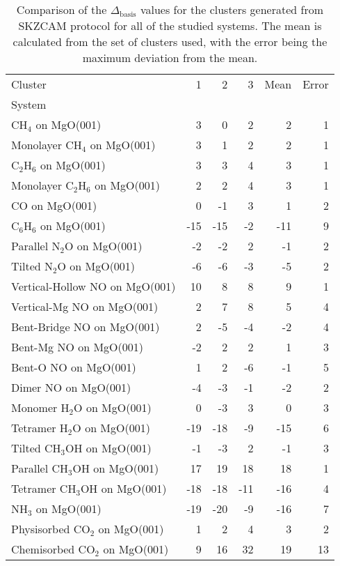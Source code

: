 \begin{table}
\caption{\label{tab:deltabasis}Comparison of the $\Delta_\textrm{basis}$ values for the clusters generated from SKZCAM protocol for all of the studied systems. The mean is calculated from the set of clusters used, with the error being the maximum deviation from the mean.}
\begin{adjustbox}{center,max width=1\textwidth}
\begin{tabular}{lrrrrr}
\toprule
Cluster & 1 & 2 & 3 & Mean & Error \\ 
System &  &  &  &  &  \\
\midrule
CH$_4$ on MgO(001) & 3 & 0 & 2 & 2 & 1 \\
Monolayer CH$_4$ on MgO(001) & 3 & 1 & 2 & 2 & 1 \\
C$_2$H$_6$ on MgO(001) & 3 & 3 & 4 & 3 & 1 \\
Monolayer C$_2$H$_6$ on MgO(001) & 2 & 2 & 4 & 3 & 1 \\
CO on MgO(001) & 0 & -1 & 3 & 1 & 2 \\
C$_6$H$_6$ on MgO(001) & -15 & -15 & -2 & -11 & 9 \\
Parallel N$_2$O on MgO(001) & -2 & -2 & 2 & -1 & 2 \\
Tilted N$_2$O on MgO(001) & -6 & -6 & -3 & -5 & 2 \\
Vertical-Hollow NO on MgO(001) & 10 & 8 & 8 & 9 & 1 \\
Vertical-Mg NO on MgO(001) & 2 & 7 & 8 & 5 & 4 \\
Bent-Bridge NO on MgO(001) & 2 & -5 & -4 & -2 & 4 \\
Bent-Mg NO on MgO(001) & -2 & 2 & 2 & 1 & 3 \\
Bent-O NO on MgO(001) & 1 & 2 & -6 & -1 & 5 \\
Dimer NO on MgO(001) & -4 & -3 & -1 & -2 & 2 \\
Monomer H$_2$O on MgO(001) & 0 & -3 & 3 & 0 & 3 \\
Tetramer H$_2$O on MgO(001) & -19 & -18 & -9 & -15 & 6 \\
Tilted CH$_3$OH on MgO(001) & -1 & -3 & 2 & -1 & 3 \\
Parallel CH$_3$OH on MgO(001) & 17 & 19 & 18 & 18 & 1 \\
Tetramer CH$_3$OH on MgO(001) & -18 & -18 & -11 & -16 & 4 \\
NH$_3$ on MgO(001) & -19 & -20 & -9 & -16 & 7 \\
Physisorbed CO$_2$ on MgO(001) & 1 & 2 & 4 & 3 & 2 \\
Chemisorbed CO$_2$ on MgO(001) & 9 & 16 & 32 & 19 & 13 \\

\end{tabular}
\end{adjustbox}
\end{table}
